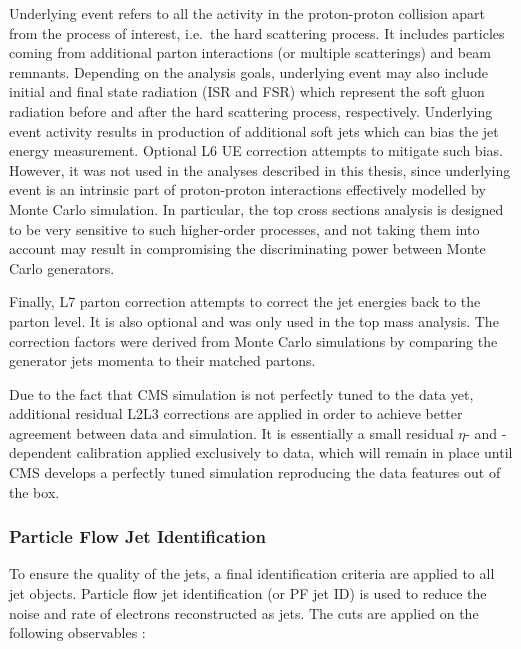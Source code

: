 Underlying event \autocite{underlying_event} refers to all the activity in the proton-proton collision apart from the
process of interest, i.e.\ the hard scattering process. It includes particles coming from additional parton interactions
(or multiple scatterings) and beam remnants. Depending on the analysis goals, underlying event may also include initial
and final state radiation (ISR and FSR) which represent the soft gluon radiation before and after the hard scattering
process, respectively. Underlying event activity results in production of additional soft jets which can bias the jet
energy measurement. Optional L6 UE correction attempts to mitigate such bias. However, it was not used in the analyses
described in this thesis, since underlying event is an intrinsic part of proton-proton interactions effectively modelled
by Monte Carlo simulation. In particular, the top cross sections analysis is designed to be very sensitive to such
higher-order processes, and not taking them into account may result in compromising the discriminating power between
Monte Carlo generators.

Finally, L7 parton correction attempts to correct the jet energies back to the parton level. It is also optional and was
only used in the top mass analysis. The correction factors were derived from Monte Carlo simulations by comparing the
generator jets momenta to their matched partons.

Due to the fact that CMS simulation is not perfectly tuned to the data yet, additional residual L2L3 corrections are
applied in order to achieve better agreement between data and simulation. It is essentially a small residual $\eta$- and
\pt-dependent calibration applied exclusively to data, which will remain in place until CMS develops a perfectly tuned
simulation reproducing the data features out of the box.



\subsubsection{Particle Flow Jet Identification}
\label{sss:PFJet_ID}
To ensure the quality of the jets, a final identification criteria are applied to all jet objects. Particle flow jet
identification (or PF jet ID) is used to reduce the noise and rate of electrons reconstructed as jets. The cuts are
applied on the following observables :

